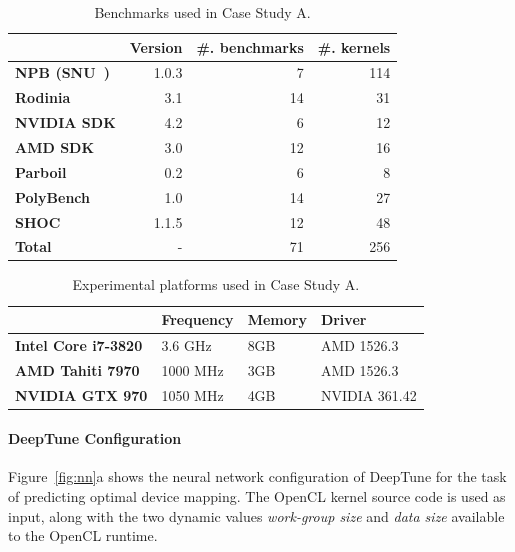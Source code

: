 \begin{table}
	\centering%
	\begin{tabular}{| l r r r |}
		\hline
		\rowcolor{gray!50}
		& \textbf{Version} & \textbf{\#. benchmarks} & \textbf{\#. kernels}\\
		\hline
		\textbf{NPB (SNU~\cite{Seo2011})} & 1.0.3 & 7 & 114 \\
		\textbf{Rodinia~\cite{Che2009}} & 3.1 & 14 & 31 \\
		\textbf{NVIDIA SDK} & 4.2 & 6 & 12 \\
		\textbf{AMD SDK} & 3.0 & 12 & 16 \\
		\textbf{Parboil~\cite{Stratton2012}} & 0.2 & 6 & 8 \\
		\textbf{PolyBench~\cite{Grauer-Gray2012}} & 1.0 & 14 & 27 \\
		\textbf{SHOC~\cite{Danalis2010}} & 1.1.5 & 12 & 48 \\
		\textbf{Total} & - & 71 & 256 \\
		\hline
	\end{tabular}
  \caption[Benchmarks used in Case Study A]{%
	  Benchmarks used in Case Study A.%
  }
	\label{tab:cgo-benchmarks}
\end{table}

\begin{table}[t!]
	\centering %
		\begin{tabular}{| l l l l| }
			\hline
			\rowcolor{gray!50}
			& \textbf{Frequency} & \textbf{Memory} & \textbf{Driver} \\
			\hline
			\textbf{Intel Core i7-3820} & 3.6 GHz & 8GB & AMD 1526.3 \\
			\textbf{AMD Tahiti 7970} & 1000 MHz & 3GB & AMD 1526.3 \\
			\textbf{NVIDIA GTX 970} & 1050 MHz & 4GB & NVIDIA 361.42 \\
			\hline
		\end{tabular}
	  \caption[Benchmarks used in Case Study A]{%
		Experimental platforms used in Case Study A.%
  	}
		\label{tab:cgo-platforms}
\end{table}


\paragraph*{DeepTune Configuration}

Figure~\ref{fig:nn}a shows the neural network configuration of DeepTune for the task of predicting optimal device mapping. The OpenCL kernel source code is used as input, along with the two dynamic values \emph{work-group size} and \emph{data size} available to the OpenCL runtime.


